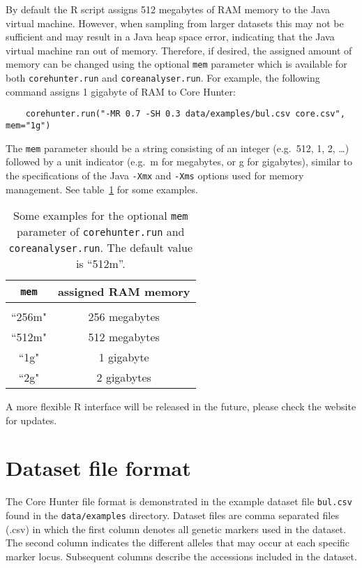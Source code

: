 \documentclass[a4paper, titlepage, 11pt]{article}
\begin{document}
By default the R script assigns 512 megabytes of RAM memory to the Java virtual machine. However, when sampling from larger datasets this may not be sufficient and may result in a Java heap space error, indicating that the Java virtual machine ran out of memory. Therefore, if desired, the assigned amount of memory can be changed using the optional \texttt{mem} parameter which is available for both \texttt{corehunter.run} and \texttt{coreanalyser.run}. For example, the following command assigns 1 gigabyte of RAM to Core Hunter:
\begin{verbatim}
    corehunter.run("-MR 0.7 -SH 0.3 data/examples/bul.csv core.csv", mem="1g")
\end{verbatim}
The \texttt{mem} parameter should be a string consisting of an integer (e.g.\ 512, 1, 2, \ldots) followed by a unit indicator (e.g.\ m for megabytes, or g for gigabytes), similar to the specifications of the Java \texttt{-Xmx} and \texttt{-Xms} options used for memory management. See table~\ref{tab:mem} for some examples.

\begin{table}
	\centering
	\begin{tabular}{c|c}
		\texttt{mem} & assigned RAM memory\\[1ex]
		\hline
		\\[-1ex]
		``256m" & 256 megabytes\\
		``512m" & 512 megabytes\\
		``1g" & 1 gigabyte\\
		``2g" & 2 gigabytes
	\end{tabular}
	\caption{Some examples for the optional \texttt{mem} parameter of \texttt{corehunter.run} and \texttt{coreanalyser.run}. The default value is ``512m''.}
	\label{tab:mem}
\end{table}

A more flexible R interface will be released in the future, please check the website for updates.

\section{Dataset file format}

The Core Hunter file format is demonstrated in the example dataset file \texttt{bul.csv} found in the \texttt{data/examples} directory. Dataset files are comma separated files (.csv) in which the first column denotes all genetic markers used in the dataset. The second column indicates the different alleles that may occur at each specific marker locus. Subsequent columns describe the accessions included in the dataset.
\end{document}
